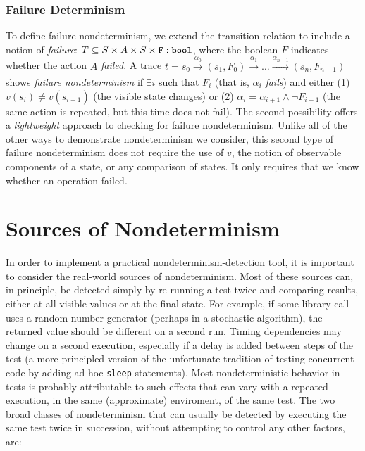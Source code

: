 \subsubsection{Failure Determinism}

To define failure nondeterminism, we extend the
transition relation to include a notion of \emph{failure}: $T \subseteq S
\times A \times S \times {\tt F: bool}$, where the boolean $F$ indicates
whether the action $A$ \emph{failed}.   A trace $t = s_0
\xrightarrow[]{\alpha_0} (s_1, F_0) \xrightarrow[]{\alpha_1} \ldots
\xrightarrow[]{\alpha_{n-1}} (s_n, F_{n-1})$ shows \emph{failure
  nondeterminism} if $\exists i$ such that $F_{i}$ (that is,
$\alpha_i$ \emph{fails}) and either (1) $v(s_{i}) \neq v(s_{i+1})$
(the visible state changes) or (2)
$\alpha_i = \alpha_{i+1} \wedge \neg F_{i+1}$ (the same action is
repeated, but this time does not fail).  The second possibility
offers a \emph{lightweight} approach to checking for failure
nondeterminism.  Unlike all of the other ways to demonstrate
nondeterminism we consider, this second type of failure nondeterminism does not
require the use of $v$, the notion of observable components of
a state, or any comparison of states.  It only
requires that we know whether an operation failed.

\section{Sources of Nondeterminism}
\label{sec:sources}

In order to implement a practical nondeterminism-detection tool, it is
important to consider the real-world sources of nondeterminism.  Most of these
sources can, in principle, be detected simply by re-running a test
twice and comparing results, either at all visible values or at the
final state.  For example, if some library call uses a random number
generator (perhaps in a stochastic algorithm), the returned value should be
different on a second run.  Timing dependencies may change on a second
execution, especially if a delay is added between steps of the test (a
more principled version of the unfortunate tradition of testing
concurrent code by adding ad-hoc {\tt sleep} statements).   Most
nondeterministic behavior in tests is probably attributable to such
effects that can vary with a repeated execution, in the same
(approximate) enviroment, of the same test.  The two broad classes of
nondeterminism that can usually be detected by
executing the same test twice in succession, without attempting
to control any other factors, are:

